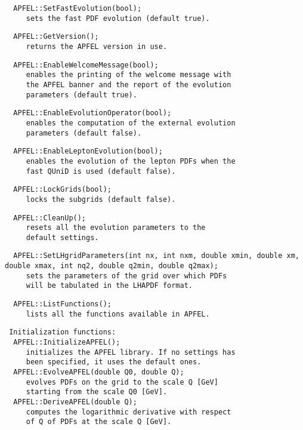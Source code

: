 \documentclass[11pt,a4paper]{article}
\begin{document}
\begin{lstlisting}
  APFEL::SetFastEvolution(bool);
     sets the fast PDF evolution (default true).
\end{lstlisting}
\begin{lstlisting}
  APFEL::GetVersion();
     returns the APFEL version in use.
\end{lstlisting}
\begin{lstlisting}
  APFEL::EnableWelcomeMessage(bool);
     enables the printing of the welcome message with
     the APFEL banner and the report of the evolution
     parameters (default true).
\end{lstlisting}
\begin{lstlisting}
  APFEL::EnableEvolutionOperator(bool);
     enables the computation of the external evolution
     parameters (default false).
\end{lstlisting}
\begin{lstlisting}
  APFEL::EnableLeptonEvolution(bool);
     enables the evolution of the lepton PDFs when the
     fast QUniD is used (default false).
\end{lstlisting}
\begin{lstlisting}
  APFEL::LockGrids(bool);
     locks the subgrids (default false).
\end{lstlisting}
\begin{lstlisting}
  APFEL::CleanUp();
     resets all the evolution parameters to the
     default settings.
\end{lstlisting}
\begin{lstlisting}
  APFEL::SetLHgridParameters(int nx, int nxm, double xmin, double xm, double xmax, int nq2, double q2min, double q2max);
     sets the parameters of the grid over which PDFs
     will be tabulated in the LHAPDF format.
\end{lstlisting}
\begin{lstlisting}
  APFEL::ListFunctions();
     lists all the functions available in APFEL.
\end{lstlisting}




\begin{lstlisting}
 Initialization functions: 
  APFEL::InitializeAPFEL();
     initializes the APFEL library. If no settings has
     been specified, it uses the default ones.
  APFEL::EvolveAPFEL(double Q0, double Q);
     evolves PDFs on the grid to the scale Q [GeV]
     starting from the scale Q0 [GeV].
  APFEL::DeriveAPFEL(double Q);
     computes the logarithmic derivative with respect
     of Q of PDFs at the scale Q [GeV].
\end{lstlisting}
\end{document}
